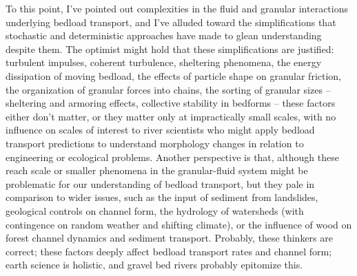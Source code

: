 \documentclass{article}
\begin{document}
To this point, I've pointed out complexities in the fluid and granular interactions underlying bedload transport, and I've alluded toward the simplifications that stochastic and deterministic approaches have made to glean understanding despite them. 
The optimist might hold that these simplifications are justified: turbulent impulses, coherent turbulence, sheltering phenomena, the energy dissipation of moving bedload, the effects of particle shape on granular friction, the organization of granular forces into chains, the sorting of granular sizes -- sheltering and armoring effects, collective stability in bedforms -- these factors either don't matter, or they matter only at impractically small scales, with no influence on scales of interest to river scientists who might apply bedload transport predictions to understand morphology changes in relation to engineering or ecological problems.
Another perspective is that, although these reach scale or smaller phenomena in the granular-fluid system might be problematic for our understanding of bedload transport, but they pale in comparison to wider issues, such as the input of sediment from landslides, geological controls on channel form, the hydrology of watersheds (with contingence on random weather and shifting climate), or the influence of wood on forest channel dynamics and sediment transport. 
Probably, these thinkers are correct; these factors deeply affect bedload transport rates and channel form; earth science is holistic, and gravel bed rivers probably epitomize this.
\end{document}
